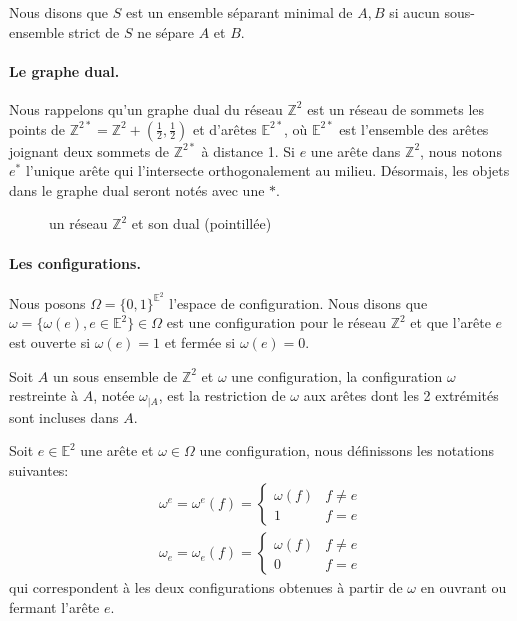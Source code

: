 \documentclass[titlepage,a4paper,12pt]{article}
\newcounter{cor}
\begin{document}
Nous disons que $S$ est un ensemble séparant minimal de $A,B$ si aucun sous-ensemble strict de $S$ ne sépare $A$ et $B$.

\paragraph{Le graphe dual.}Nous rappelons qu'un graphe dual du réseau $\mathbb{Z}^2$ est un réseau de sommets les points de $ \mathbb{Z}^{2*} = \mathbb{Z}^2+(\frac{1}{2},\frac{1}{2})$ et d'arêtes $\mathbb{E}^{2*}$, où $\mathbb{E}^{2*}$ est l'ensemble des arêtes joignant deux sommets de $\mathbb{Z}^{2*}$ à distance 1. Si $e$ une arête dans $\mathbb{Z}^2$, nous notons $e^*$ l'unique arête qui l'intersecte orthogonalement au milieu. Désormais, les objets dans le graphe dual seront notés avec une $*$.
\begin{figure}[h]
\center
{}
\caption{un réseau $\mathbb{Z}^2$ et son dual (pointillée)}
\end{figure}

\paragraph{Les configurations.} Nous posons $\Omega = \{0,1\}^{\mathbb{E}^2}$ l'espace de configuration. Nous disons que $\omega = \{\omega(e), e\in \mathbb{E}^2\} \in \Omega$ est une configuration pour le réseau $\mathbb{Z}^2$ et que l'arête $e$ est ouverte si $\omega(e) = 1$ et fermée si $\omega(e)= 0$.

Soit $A$ un sous ensemble de $\mathbb{Z}^2$ et $\omega$ une configuration, la configuration $\omega$ restreinte à $A$, notée $\omega_{\mid A}$, est la restriction de $\omega$ aux arêtes dont les 2 extrémités sont incluses dans $A$.

Soit $e\in \mathbb{E}^2$ une arête et $\omega\in \Omega$ une configuration, nous définissons les notations suivantes:
$$\begin{array}{c}
 \omega^e = \omega^e(f) = \left\lbrace \begin{array}{cc}
	\omega(f) & f\neq e \\
	1 & f=e 
 \end{array}\right. \\
 \omega_e = \omega_e(f) = \left\lbrace \begin{array}{cc}
	\omega(f) & f\neq e \\
	0 & f=e
 \end{array}\right.
\end{array}$$
qui correspondent à les deux configurations obtenues à partir de $\omega$ en ouvrant ou fermant l'arête $e$.
\end{document}
